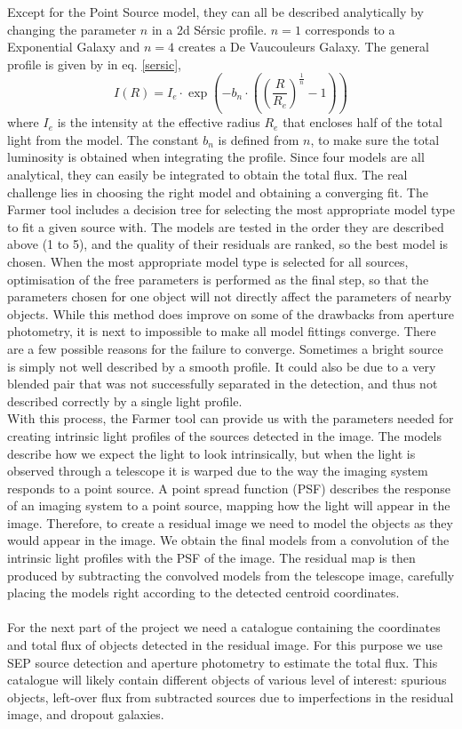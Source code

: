 Except for the Point Source model, they can all be described analytically by changing the parameter $n$ in a 2d Sérsic profile. $n=1$ corresponds to a Exponential Galaxy and $n=4$ creates a De Vaucouleurs Galaxy. The general profile is given by \cite{1968adga_book} in eq. \ref{sersic},
\begin{equation}
   I(R) = I_e \cdot \exp \left(-b_n \cdot \left( \left( \frac{R}{R_e} \right)^{\frac{1}{n}} - 1\right) \right)
   \label{sersic}
\end{equation}
where $I_e$ is the intensity at the effective radius $R_e$ that encloses half of the total light from the model. The constant $b_n$ is defined from $n$, to make sure the total luminosity is obtained when integrating the profile. Since four models are all analytical, they can easily be integrated to obtain the total flux. The real challenge lies in choosing the right model and obtaining a converging fit. The Farmer tool includes a decision tree for selecting the most appropriate model type to fit a given source with. The models are tested in the order they are described above (1 to 5), and the quality of their residuals are ranked, so the best model is chosen. When the most appropriate model type is selected for all sources, optimisation of the free parameters is performed as the final step, so that the parameters chosen for one object will not directly affect the parameters of nearby objects. While this method does improve on some of the drawbacks from aperture photometry, it is next to impossible to make all model fittings converge. There are a few possible reasons for the failure to converge. Sometimes a bright source is simply not well described by a smooth profile. It could also be due to a very blended pair that was not successfully separated in the detection, and thus not described correctly by a single light profile. \\
With this process, the Farmer tool can provide us with the parameters needed for creating intrinsic light profiles of the sources detected in the image. The models describe how we expect the light to look intrinsically, but when the light is observed through a telescope it is warped due to the way the imaging system responds to a point source. A point spread function (PSF) describes the response of an imaging system to a point source, mapping how the light will appear in the image. Therefore, to create a residual image we need to model the objects as they would appear in the image. We obtain the final models from a convolution of the intrinsic light profiles with the PSF of the image. The residual map is then produced by subtracting the convolved models from the telescope image, carefully placing the models right according to the detected centroid coordinates. \\ \\
For the next part of the project we need a catalogue containing the coordinates and total flux of objects detected in the residual image. For this purpose we use SEP source detection and aperture photometry to estimate the total flux. This catalogue will likely contain different objects of various level of interest: spurious objects, left-over flux from subtracted sources due to imperfections in the residual image, and dropout galaxies.

